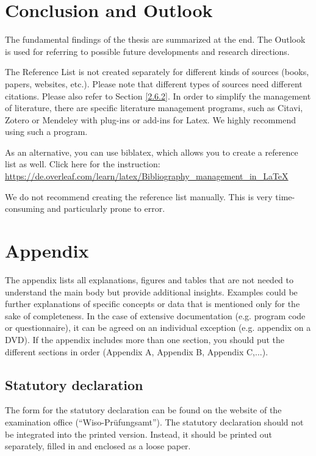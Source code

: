 \documentclass[a4paper,12pt, titlepage]{article}
\begin{document}
\section{Conclusion and Outlook}\label{3}
The fundamental findings of the  thesis are summarized at the end. The Outlook is used for referring to possible future developments and research directions.


\newpage{}
\printbibliography[
heading=bibintoc,
title={Reference list}                                          %
]

The Reference List is not created separately for different kinds of sources (books, papers, websites, etc.). Please note that different types of sources need different citations. Please also refer to Section \ref{2.6.2}.
In order to simplify the management of literature, there are specific literature management programs, such as Citavi, Zotero or Mendeley with plug-ins or add-ins for Latex. We highly recommend using such a program.

As an alternative, you can use biblatex, which allows you to create a reference list as well. Click here for the instruction: \url{https://de.overleaf.com/learn/latex/Bibliography_management_in_LaTeX}

We do not recommend creating the reference list manually. This is very time-consuming and particularly prone to error. 



\newpage{}
\section*{Appendix}
The appendix lists all explanations, figures and tables that are not needed to understand the main body but provide additional insights. Examples could be further explanations of specific concepts or data that is mentioned only for the sake of completeness. 
In the case of extensive documentation (e.g. program code or questionnaire), it can be agreed on an individual exception (e.g. appendix on a DVD).
If the appendix includes more than one section, you should put the different sections in order (Appendix A, Appendix B, Appendix C,...).

\subsection*{\newpage{}Statutory declaration}
The form for the statutory declaration can be found on the website of the examination office (“Wiso-Prüfungsamt”). The statutory declaration should not be integrated into the printed version. Instead, it should be printed out separately, filled in and enclosed as a loose paper.
\end{document}
